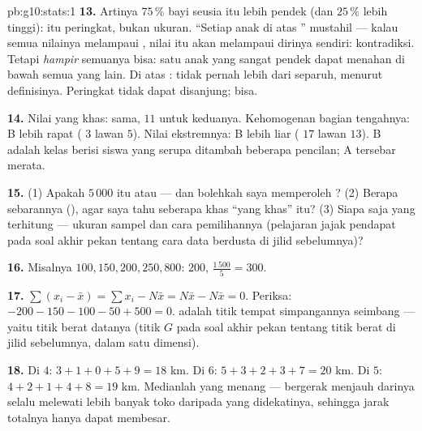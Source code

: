 \begin{solution}{pb:g10:stats:1}
\textbf{13.} Artinya $75\,\%$ bayi seusia itu lebih
pendek (dan $25\,\%$ lebih tinggi): itu peringkat, bukan ukuran. ``Setiap
anak di atas '' mustahil --- kalau semua nilainya melampaui
,  nilai itu akan melampaui dirinya sendiri:
kontradiksi. Tetapi \emph{hampir} semuanya bisa: satu anak yang sangat
pendek dapat menahan  di bawah semua yang lain. Di atas
\emph{}: tidak pernah lebih dari separuh, menurut definisinya.
Peringkat tidak dapat disanjung;  bisa.

\textbf{14.} Nilai yang khas: sama,  $11$ untuk keduanya.
Kehomogenan bagian tengahnya: B lebih rapat ( $3$
lawan $5$). Nilai ekstremnya: B lebih liar ( $17$ lawan $13$).
B adalah kelas berisi siswa yang serupa ditambah beberapa pencilan; A
tersebar merata.

\textbf{15.} (1) Apakah $5\,000$ itu  atau  --- dan bolehkah
saya memperoleh ? (2) Berapa sebarannya (), agar saya
tahu seberapa khas ``yang khas'' itu? (3) Siapa saja yang terhitung ---
ukuran sampel dan cara pemilihannya (pelajaran jajak pendapat pada soal
akhir pekan tentang cara data berdusta di jilid sebelumnya)?

\textbf{16.} Misalnya $100, 150, 200, 250, 800$: 
$200$,  $\frac{1\,500}{5} = 300$.

\textbf{17.} $\sum (x_i - \bar x) = \sum x_i - N \bar x =
N\bar x - N\bar x = 0$. Periksa: $-200 - 150 - 100 - 50 + 500 =
0$.  adalah titik tempat simpangannya seimbang --- yaitu
titik berat datanya (titik $G$ pada soal akhir pekan tentang titik berat
di jilid sebelumnya, dalam satu dimensi).

\textbf{18.} Di  $4$: $3 + 1 + 0 + 5 + 9 = 18$ km. Di
 $6$: $5 + 3 + 2 + 3 + 7 = 20$ km. Di $5$:
$4 + 2 + 1 + 4 + 8 = 19$ km. Medianlah yang menang --- bergerak menjauh
darinya selalu melewati lebih banyak toko daripada yang didekatinya,
sehingga jarak totalnya hanya dapat membesar.


\end{solution}
